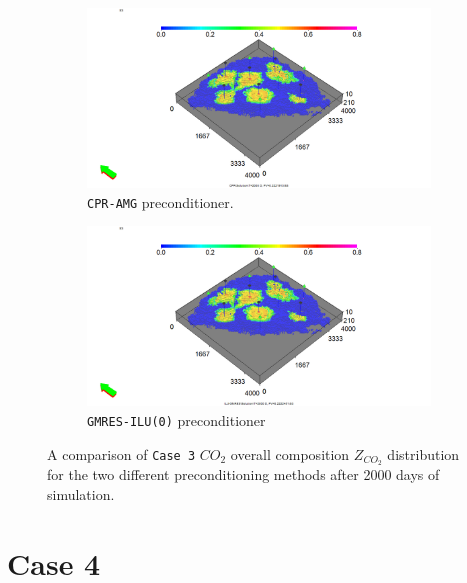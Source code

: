 \begin{figure}
\centering
\begin{subfigure}{.5\textwidth}
  \centering
  \includegraphics[width=1.3\linewidth]{figures/case3_cpr_sgas.png}
  \caption{\texttt{CPR-AMG} preconditioner.}
\end{subfigure}%
\begin{subfigure}{.5\textwidth}
  \centering
  \includegraphics[width=1.3\linewidth]{figures/case3_ilu_sgas.png}
  \caption{\texttt{GMRES-ILU(0)} preconditioner}
\end{subfigure}
\caption{A comparison of \texttt{Case 3} $CO_{2}$ overall composition $Z_{CO_{2}}$ distribution for the two different preconditioning methods after 2000 days of simulation.}
\label{case1sg}
\end{figure}

\section{Case 4}

